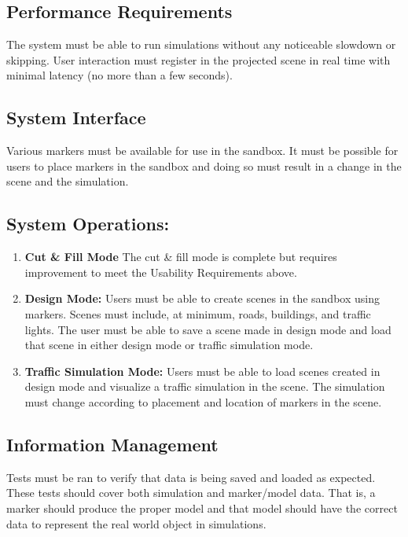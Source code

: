 \documentclass[letterpaper, 10pt, onecolumn, draftclsnofoot]{IEEEtran}
\begin{document}
    \subsection{\textbf{Performance Requirements}}
    The system must be able to run simulations without any noticeable slowdown or skipping. User interaction must register in the projected scene in real time with minimal latency (no more than a few seconds).
    
    \subsection{\textbf{System Interface}}
    Various markers must be available for use in the sandbox. It must be possible for users to place markers in the sandbox and doing so must result in a change in the scene and the simulation.

    \subsection{\textbf{System Operations:}}
        \begin{enumerate}[\label={}]
        \item{\textbf{Cut \& Fill Mode} The cut \& fill mode is complete but requires improvement to meet the Usability Requirements above.}
        
        \item{\textbf{Design Mode:} Users must be able to create scenes in the sandbox using markers. Scenes must include, at minimum, roads, buildings, and traffic lights. The user must be able to save a scene made in design mode and load that scene in either design mode or traffic simulation mode.}
        
        \item{\textbf{Traffic Simulation Mode:} Users must be able to load scenes created in design mode and visualize a traffic simulation in the scene. The simulation must change according to placement and location of markers in the scene.}
    \end{enumerate}
    
    \subsection{\textbf{Information Management}}
    Tests must be ran to verify that data is being saved and loaded as expected. These tests should cover both simulation and marker/model data. That is, a marker should produce the proper model and that model should have the correct data to represent the real world object in simulations.  
    
\end{document}
